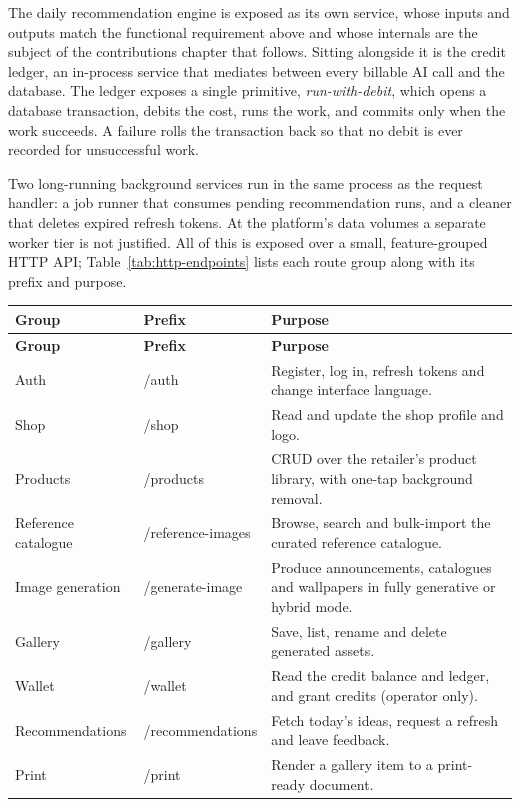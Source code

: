 The daily recommendation engine is exposed as its own service, whose inputs and outputs match the functional requirement above and whose internals are the subject of the contributions chapter that follows. Sitting alongside it is the credit ledger, an in-process service that mediates between every billable AI call and the database. The ledger exposes a single primitive, \emph{run-with-debit}, which opens a database transaction, debits the cost, runs the work, and commits only when the work succeeds. A failure rolls the transaction back so that no debit is ever recorded for unsuccessful work.

Two long-running background services run in the same process as the request handler: a job runner that consumes pending recommendation runs, and a cleaner that deletes expired refresh tokens. At the platform's data volumes a separate worker tier is not justified. All of this is exposed over a small, feature-grouped HTTP API; Table~\ref{tab:http-endpoints} lists each route group along with its prefix and purpose.

{\small
\renewcommand{\arraystretch}{1.3}
\begin{tabularx}{\textwidth}{|>{\raggedright\arraybackslash}p{3.2cm}|>{\raggedright\arraybackslash}p{3.6cm}|Y|}
\caption{HTTP route groups exposed by the application server.}\label{tab:http-endpoints}\\
\hline
\textbf{Group} & \textbf{Prefix} & \textbf{Purpose} \\
\hline
\endfirsthead
\hline
\textbf{Group} & \textbf{Prefix} & \textbf{Purpose} \\
\hline
\endhead
\hline
\endfoot
\hline
\endlastfoot
Auth & /auth & Register, log in, refresh tokens and change interface language. \\
\hline
Shop & /shop & Read and update the shop profile and logo. \\
\hline
Products & /products & CRUD over the retailer's product library, with one-tap background removal. \\
\hline
Reference catalogue & /reference-images & Browse, search and bulk-import the curated reference catalogue. \\
\hline
Image generation & /generate-image & Produce announcements, catalogues and wallpapers in fully generative or hybrid mode. \\
\hline
Gallery & /gallery & Save, list, rename and delete generated assets. \\
\hline
Wallet & /wallet & Read the credit balance and ledger, and grant credits (operator only). \\
\hline
Recommendations & /recommendations & Fetch today's ideas, request a refresh and leave feedback. \\
\hline
Print & /print & Render a gallery item to a print-ready document. \\
\end{tabularx}
}

